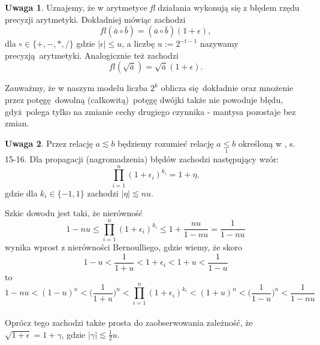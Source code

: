 \documentclass[10pt,wide]{mwart}
\theoremstyle{definition}
\newtheorem{uw}{Uwaga}
\begin{document}
\begin{uw}
  Uznajemy, że w arytmetyce \emph{fl} działania wykonują się z błędem rzędu precyzji arytmetyki. Dokładniej mówiąc zachodzi
  $$fl(\bar{a} \circ \bar{b}) = (\bar{a} \circ \bar{b})(1+ \epsilon),$$ dla \(\circ \in \{+, -, *, /\}\) gdzie \(|\epsilon| \leq u\), a liczbę \(u := 2^{-t-1}\) nazywamy precyzją arytmetyki.
  Analogicznie też zachodzi $$fl(\sqrt{\bar{a}}) = \sqrt{\bar{a}}(1+ \epsilon).$$
\end{uw}
Zauważmy, że w naszym modelu liczba \(2^k\) oblicza się dokładnie
oraz mnożenie przez potęgę dowolną (całkowitą) potęgę dwójki także nie powoduje błędu,
gdyż polega tylko na zmianie cechy drugiego czynnika - mantysa pozostaje bez zmian.
\begin{uw}
  Przez relację \(a \lesssim b\) będziemy rozumieć relację \(a \underset{1}{\leqslant} b\) określoną w \cite{JMJ}, s. 15-16.
  Dla propagacji (nagromadzenia) błędów zachodzi następujący wzór:
  \begin{equation*}
    \prod_{i=1}^{n} (1 + \epsilon_i)^{k_i} = 1 + \eta,
  \end{equation*}
  gdzie dla \(k_i \in \{-1,1\}\) zachodzi \(|\eta| \lesssim nu \).
    \par Szkic dowodu jest taki, że nierówność $$  1 - nu \leq \prod_{i=1}^{n} (1 + \epsilon_i)^{k_i} \leq 1 + \frac{nu}{1-nu} = \frac{1}{1 - nu} $$
    wynika wprost z nierówności Bernoulliego, gdzie wiemy, że skoro $$ 1 - u < \frac{1}{1+u} < 1 + \epsilon_i < 1 + u <\frac{1}{1-u} $$
    to  $$ 1 - nu < (1 - u)^n < \Big(\frac{1}{1+u}\Big)^n < \prod_{i=1}^{n} (1 + \epsilon_i)^{k_i} < (1 + u)^n < \Big(\frac{1}{1-u}\Big)^n < \frac{1}{1-nu} $$
    \\
  Oprócz tego zachodzi także prosta do zaobserwowania zależność, że \(\sqrt{1+\epsilon} = 1 + \gamma\), gdzie \(|\gamma| \lesssim \frac{1}{2}u \).
\end{uw}
\end{document}
